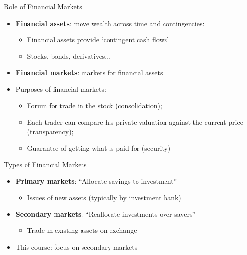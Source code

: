\documentclass[english,10pt]{beamer}
\theoremstyle{definition}
\begin{document}
\begin{frame}{Role of Financial Markets}
\begin{itemize}
	\item \textbf{Financial assets}: move wealth across time and contingencies: 
	\begin{itemize}
		\item Financial assets provide `contingent cash flows'
		\item Stocks, bonds, derivatives...
	\end{itemize}
	\item \textbf{Financial markets}: markets for financial assets
	\item Purposes of financial markets:
	\begin{itemize}
		\item Forum for trade in the stock (\alert{consolidation});
		\item Each trader can compare his private valuation against the current price (\alert{transparency});
		\item Guarantee of getting what is paid for (\alert{security})
	\end{itemize}
\end{itemize}
\end{frame}


\begin{frame}{Types of Financial Markets}
\begin{itemize} 
	\item \textbf{Primary markets}: ``Allocate savings to investment''
	\begin{itemize}
		\item Issues of new assets (typically by investment bank)
	\end{itemize}
	\item \textbf{Secondary markets}: ``Reallocate investments over savers''
	\begin{itemize}
		\item Trade in existing assets on exchange
	\end{itemize}	
	\item This course: focus on secondary markets 
\end{itemize}
\end{frame}
\end{document}
